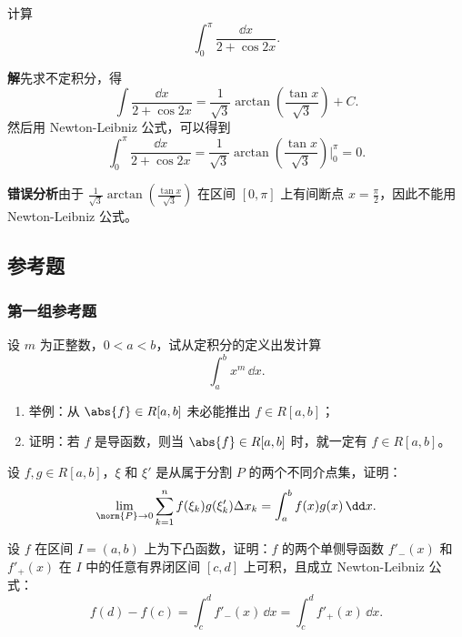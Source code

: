 \begin{xexample}[10.5.3]
计算
\[
  \int_0^\pi\frac{\dd x}{2+\cos2x}.
\]
\end{xexample}
\begin{xsolution}
\textbf{解}\quad 先求不定积分，得
\[
  \int\frac{\dd x}{2+\cos2x}
  =\frac1{\sqrt3}\arctan\left(\frac{\tan x}{\sqrt3}\right)+C.
\]
然后用 Newton-Leibniz 公式，可以得到
\[
  \int_0^\pi\frac{\dd x}{2+\cos2x}
  =\frac1{\sqrt3}\arctan\left(\frac{\tan x}{\sqrt3}\right)\Big|_0^\pi=0.
\]

\textbf{错误分析}\quad 由于 $\frac1{\sqrt3}\arctan(\frac{\tan x}{\sqrt3})$ 在区间 $[0,\pi]$ 上有间断点 $x=\frac\pi2$，因此不能用 Newton-Leibniz 公式。
\end{xsolution}

\subsection{参考题}

\subsubsection*{第一组参考题}

\begin{xreferenceproblem}[1]
设 $m$ 为正整数，$0<a<b$，试从定积分的定义出发计算
\[
  \int_a^b x^m\,\dd x.
\]
\end{xreferenceproblem}

\begin{xreferenceproblem}[2]
\begin{enumerate}[label=(\arabic*)]
  \item 举例：从 $\abs{f}\in R[a,b]$ 未必能推出 $f\in R[a,b]$；
  \item 证明：若 $f$ 是导函数，则当 $\abs{f}\in R[a,b]$ 时，就一定有 $f\in R[a,b]$。
\end{enumerate}
\end{xreferenceproblem}

\begin{xreferenceproblem}[3]
设 $f,g\in R[a,b]$，$\xi$ 和 $\xi'$ 是从属于分割 $P$ 的两个不同介点集，证明：
\[
  \lim_{\norm{P}\to0}\sum_{k=1}^n f(\xi_k)g(\xi'_k)\Delta x_k
  =\int_a^b f(x)g(x)\,\dd x.
\]
\end{xreferenceproblem}

\begin{xreferenceproblem}[4]
设 $f$ 在区间 $I=(a,b)$ 上为下凸函数，证明：$f$ 的两个单侧导函数 $f'_-(x)$ 和 $f'_+(x)$ 在 $I$ 中的任意有界闭区间 $[c,d]$ 上可积，且成立 Newton-Leibniz 公式：
\[
  f(d)-f(c)=\int_c^d f'_-(x)\,\dd x=\int_c^d f'_+(x)\,\dd x.
\]
\end{xreferenceproblem}

